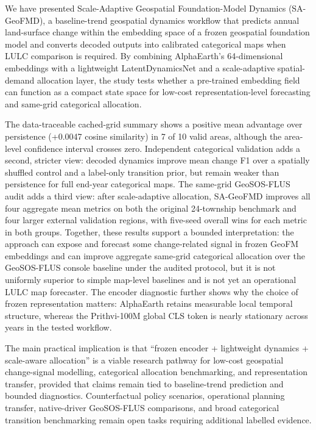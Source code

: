 \documentclass{article}
\begin{document}
We have presented Scale-Adaptive Geospatial Foundation-Model Dynamics (SA-GeoFMD), a baseline-trend geospatial dynamics workflow that predicts annual land-surface change within the embedding space of a frozen geospatial foundation model and converts decoded outputs into calibrated categorical maps when LULC comparison is required. By combining AlphaEarth's 64-dimensional embeddings with a lightweight LatentDynamicsNet and a scale-adaptive spatial-demand allocation layer, the study tests whether a pre-trained embedding field can function as a compact state space for low-cost representation-level forecasting and same-grid categorical allocation.

The data-traceable cached-grid summary shows a positive mean advantage over persistence (+0.0047 cosine similarity) in 7 of 10 valid areas, although the area-level confidence interval crosses zero. Independent categorical validation adds a second, stricter view: decoded dynamics improve mean change F1 over a spatially shuffled control and a label-only transition prior, but remain weaker than persistence for full end-year categorical maps. The same-grid GeoSOS-FLUS audit adds a third view: after scale-adaptive allocation, SA-GeoFMD improves all four aggregate mean metrics on both the original 24-township benchmark and four larger external validation regions, with five-seed overall wins for each metric in both groups. Together, these results support a bounded interpretation: the approach can expose and forecast some change-related signal in frozen GeoFM embeddings and can improve aggregate same-grid categorical allocation over the GeoSOS-FLUS console baseline under the audited protocol, but it is not uniformly superior to simple map-level baselines and is not yet an operational LULC map forecaster. The encoder diagnostic further shows why the choice of frozen representation matters: AlphaEarth retains measurable local temporal structure, whereas the Prithvi-100M global CLS token is nearly stationary across years in the tested workflow.

The main practical implication is that ``frozen encoder + lightweight dynamics + scale-aware allocation'' is a viable research pathway for low-cost geospatial change-signal modelling, categorical allocation benchmarking, and representation transfer, provided that claims remain tied to baseline-trend prediction and bounded diagnostics. Counterfactual policy scenarios, operational planning transfer, native-driver GeoSOS-FLUS comparisons, and broad categorical transition benchmarking remain open tasks requiring additional labelled evidence.
\end{document}
